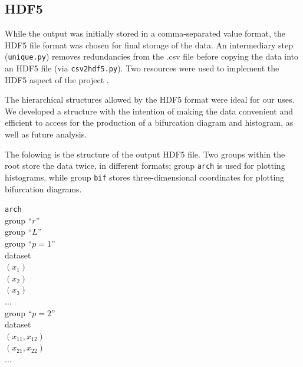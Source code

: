 \documentclass[12pt]{article}
\begin{document}
\subsection{HDF5}
\hspace{5mm} While the output was initially stored in a
comma-separated value format, the HDF5 file format was chosen for
final storage of the data. An intermediary step (\texttt{unique.py})
removes redundancies from the .csv file before copying the data into
an HDF5 file (via \texttt{csv2hdf5.py}). Two resources were used to
implement the HDF5 aspect of the project \cite{folk} \cite{UserGuide}. 

The hierarchical structures allowed by the HDF5 format were ideal for our uses. We developed a structure with the intention of making the data convenient and efficient to access for the production of a bifurcation diagram and histogram, as well as future analysis.

The folowing is the structure of the output HDF5 file. Two groups
within the root store the data twice, in different formats; group
\texttt{arch} is used for plotting histograms, while group
\texttt{bif} stores three-dimensional coordinates for plotting
bifurcation diagrams.

\begin{tabbing}
\texttt{arch}\\
	\hspace{5mm} group ``$r$'' \\
		\hspace{10mm} group ``$L$'' \\
		\hspace{15mm} group ``$p=1$'' \\
				\hspace{20mm} dataset \\
					\hspace{25mm} $ (x_{1})$ \\
					\hspace{25mm} $ (x_{2})$ \\
					\hspace{25mm} $ (x_{3})$ \\
					\hspace{25mm} ... \\	
			\hspace{15mm} group ``$p=2$'' \\
				\hspace{20mm} dataset \\
					\hspace{25mm}                           $(x_{11},x_{12})$ \\
					\hspace{25mm} $(x_{21},x_{22})$ \\
					\hspace{25mm} ... \\
\end{tabbing}
\end{document}
